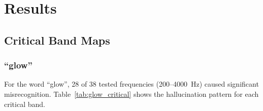 \documentclass[11pt,a4paper]{article}
\begin{document}
\section{Results}

\subsection{Critical Band Maps}

\subsubsection{``glow''}
For the word ``glow'', 28 of 38 tested frequencies (200--4000~Hz) caused
significant misrecognition. Table~\ref{tab:glow_critical} shows the
hallucination pattern for each critical band.
\end{document}
